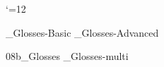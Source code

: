 



 \catcode`\@=12












_Glosses-Basic
_Glosses-Advanced
%
%


\bye
\get 08b_Glosses
_Glosses-multi

